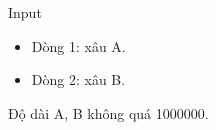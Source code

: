 Input
\begin{itemize}
	\item Dòng 1: xâu A.
	\item Dòng 2: xâu B.
\end{itemize}

Độ dài A, B không quá 1000000.